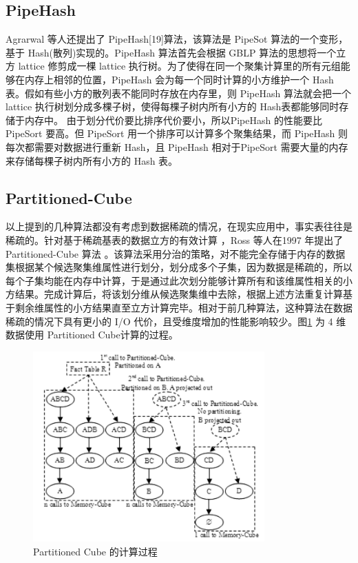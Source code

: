 \subsection{PipeHash}

Agrarwal 等人还提出了 PipeHash[19]算法，该算法是 PipeSot 算法的一个变形，基于 Hash(散列)实现的。PipeHash 算法首先会根据 GBLP 算法的思想将一个立方 lattice 修剪成一棵 lattice 执行树。为了使得在同一个聚集计算里的所有元组能够在内存上相邻的位置，PipeHash 会为每一个同时计算的小方维护一个 Hash 表。假如有些小方的散列表不能同时存放在内存里，则 PipeHash 算法就会把一个 lattice 执行树划分成多棵子树，使得每棵子树内所有小方的 Hash表都能够同时存储于内存中。 由于划分代价要比排序代价要小，所以PipeHash 的性能要比 PipeSort 要高。但 PipeSort 用一个排序可以计算多个聚集结果，而 PipeHash 则每次都需要对数据进行重新 Hash，且 PipeHash 相对于PipeSort 需要大量的内存来存储每棵子树内所有小方的 Hash 表。

\subsection{Partitioned-Cube}

以上提到的几种算法都没有考虑到数据稀疏的情况，在现实应用中，事实表往往是稀疏的。针对基于稀疏基表的数据立方的有效计算 ，Ross 等人在1997 年提出了 Partitioned-Cube 算法 \cite{ross1997fast}。该算法采用分治的策略，对不能完全存储于内存的数据集根据某个候选聚集维属性进行划分，划分成多个子集，因为数据是稀疏的，所以每个子集均能在内存中计算，于是通过此次划分能够计算所有和该维属性相关的小方结果。完成计算后，将该划分维从候选聚集维中去除，根据上述方法重复计算基于剩余维属性的小方结果直至立方计算完毕。相对于前几种算法，这种算法在数据稀疏的情况下具有更小的 I/O 代价，且受维度增加的性能影响较少。图\ref{partitioned_cube} 为 4 维数据使用 Partitioned Cube计算的过程。

\begin{figure}[!htb]
\centering\includegraphics[width=3.5in]{picture/ch_current_research/partitioned_cube} 
\caption{Partitioned Cube 的计算过程}\label{partitioned_cube} 
\end{figure} 

